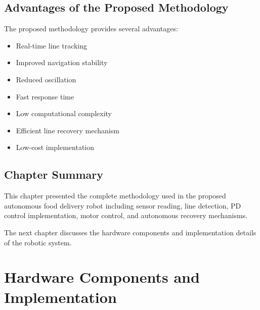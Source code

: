 \documentclass[12pt,a4paper,oneside]{report}
\begin{document}

\section{Advantages of the Proposed Methodology}

The proposed methodology provides several advantages:

\begin{itemize}

\item Real-time line tracking

\item Improved navigation stability

\item Reduced oscillation

\item Fast response time

\item Low computational complexity

\item Efficient line recovery mechanism

\item Low-cost implementation

\end{itemize}


\section{Chapter Summary}

This chapter presented the complete methodology used in the proposed autonomous food delivery robot including sensor reading, line detection, PD control implementation, motor control, and autonomous recovery mechanisms.

The next chapter discusses the hardware components and implementation details of the robotic system.


\chapter{Hardware Components and Implementation}
\end{document}
